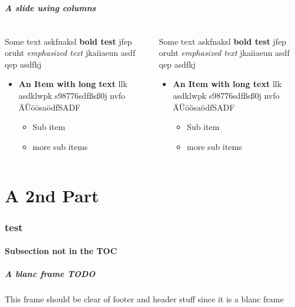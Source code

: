 \documentclass[german,aspectratio=169,notoc]{tudbeamer}%
\begin{document}
\begin{frame}
	\frametitle{A slide using columns}
	\begin{columns}
	   	\begin{column}{.5\textwidth}
	   		Some text askfnaksl \textbf{bold test} jfep oruht \emph{emphasized text} jkaiiaeun asdf qep  asdfkj  
	   		\begin{itemize}
	   			\item \textbf{An Item with long text} llk asdklwpk s98776sdfßsß0j nvfo ÄÜöösaödfSADF
	   			\begin{itemize}
	   				\item Sub item
	   				\item more sub items
	   			\end{itemize}
	   		\end{itemize}
		\end{column}
	   	\begin{column}{.5\textwidth}
	   		Some text askfnaksl \textbf{bold test} jfep oruht \emph{emphasized text} jkaiiaeun asdf qep  asdfkj  
	   		\begin{itemize}
	   			\item \textbf{An Item with long text} llk asdklwpk s98776sdfßsß0j nvfo ÄÜöösaödfSADF
	   			\begin{itemize}
	   				\item Sub item
	   				\item more sub items
	   			\end{itemize}
	   		\end{itemize}
		\end{column}
	\end{columns}
\end{frame}

\part{A 2nd Part}
\section{test}
\subsection*{Subsection not in the TOC}
\begin{frame}[allowframebreaks]
	\frametitle{A blanc frame TODO}
	This frame should be clear of footer and header stuff since it is a blanc frame
\end{frame}
\end{document}
